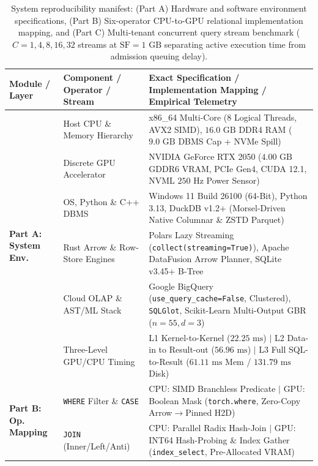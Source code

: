 \documentclass[10pt,a4paper]{article}
\begin{document}
\begin{table}[!t]
\centering
\caption{System reproducibility manifest: (Part A) Hardware and software environment specifications, (Part B) Six-operator CPU-to-GPU relational implementation mapping, and (Part C) Multi-tenant concurrent query stream benchmark ($C=1, 4, 8, 16, 32$ streams at $\text{SF}=1\text{ GB}$ separating active execution time from admission queuing delay).}
\label{tab:system_manifest}\label{tab:env_manifest}\label{tab:reproducibility_manifest}\label{tab:environment_manifest}
\scriptsize
\setlength{\tabcolsep}{3.2pt}
\renewcommand{\arraystretch}{1.12}
\begin{tabular}{@{}p{}p{}p{}@{}}
\toprule
\textbf{Module / Layer} & \textbf{Component / Operator / Stream} & \textbf{Exact Specification / Implementation Mapping / Empirical Telemetry} \\
\midrule
\multirow{6}{=}{\textbf{Part A: System Env.}}
 & Host CPU \& Memory Hierarchy & x86\_64 Multi-Core ($8$ Logical Threads, AVX2 SIMD), $16.0\text{ GB}$ DDR4 RAM ($9.0\text{ GB}$ DBMS Cap + NVMe Spill) \\
 & Discrete GPU Accelerator & NVIDIA GeForce RTX 2050 ($4.00\text{ GB}$ GDDR6 VRAM, PCIe Gen4, CUDA 12.1, NVML $250\text{ Hz}$ Power Sensor) \\
 & OS, Python \& C++ DBMS & Windows 11 Build 26100 (64-Bit), Python 3.13, DuckDB v1.2+ (Morsel-Driven Native Columnar \& ZSTD Parquet) \\
 & Rust Arrow \& Row-Store Engines & Polars Lazy Streaming (\texttt{collect(streaming=True)}), Apache DataFusion Arrow Planner, SQLite v3.45+ B-Tree \\
 & Cloud OLAP \& AST/ML Stack & Google BigQuery (\texttt{use\_query\_cache=False}, Clustered), \texttt{SQLGlot}, Scikit-Learn Multi-Output GBR ($n=55, d=3$) \\
 & Three-Level GPU/CPU Timing & L1 Kernel-to-Kernel ($22.25\text{ ms}$) $|$ L2 Data-in to Result-out ($56.96\text{ ms}$) $|$ L3 Full SQL-to-Result ($61.11\text{ ms}$ Mem / $131.79\text{ ms}$ Disk) \\
\midrule
\multirow{6}{=}{\textbf{Part B: Op. Mapping}}
 & \texttt{WHERE} Filter \& \texttt{CASE} & CPU: SIMD Branchless Predicate $|$ GPU: Boolean Mask (\texttt{torch.where}, Zero-Copy Arrow$\rightarrow$Pinned H2D) \\
 & \texttt{JOIN} (Inner/Left/Anti) & CPU: Parallel Radix Hash-Join $|$ GPU: INT64 Hash-Probing \& Index Gather (\texttt{index\_select}, Pre-Allocated VRAM) \\

\end{tabular}
\end{table}
\end{document}
